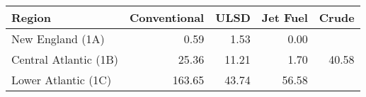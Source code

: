 \begin{tabular}{lrrrr}
  \hline
Region & Conventional & ULSD & Jet Fuel & Crude \\ 
  \hline
New England (1A) & 0.59 & 1.53 & 0.00 &  \\ 
  Central Atlantic (1B) & 25.36 & 11.21 & 1.70 & 40.58 \\ 
  Lower Atlantic (1C) & 163.65 & 43.74 & 56.58 &  \\ 
   \hline
\end{tabular}
